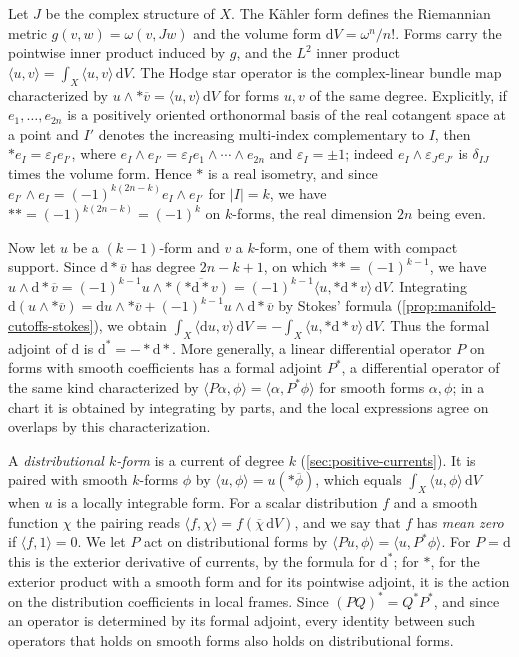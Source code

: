 Let $J$ be the complex structure of $X$. The K\"ahler form defines the Riemannian metric $g(v,w)=\omega(v,Jw)$ and the volume form $\mathrm dV=\omega^n/n!$. Forms carry the pointwise inner product induced by $g$, and the $L^2$ inner product $\langle u,v\rangle=\int_X\langle u,v\rangle\,\mathrm dV$. The Hodge star operator is the complex-linear bundle map characterized by $u\wedge*\overline v=\langle u,v\rangle\,\mathrm dV$ for forms $u,v$ of the same degree. Explicitly, if $e_1,\ldots,e_{2n}$ is a positively oriented orthonormal basis of the real cotangent space at a point and $I'$ denotes the increasing multi-index complementary to $I$, then $*e_I=\varepsilon_Ie_{I'}$, where $e_I\wedge e_{I'}=\varepsilon_Ie_1\wedge\cdots\wedge e_{2n}$ and $\varepsilon_I=\pm1$; indeed $e_I\wedge\varepsilon_Je_{J'}$ is $\delta_{IJ}$ times the volume form. Hence $*$ is a real isometry, and since $e_{I'}\wedge e_I=(-1)^{k(2n-k)}e_I\wedge e_{I'}$ for $|I|=k$, we have $**=(-1)^{k(2n-k)}=(-1)^k$ on $k$-forms, the real dimension $2n$ being even.

Now let $u$ be a $(k-1)$-form and $v$ a $k$-form, one of them with compact support. Since $\mathrm d*\overline v$ has degree $2n-k+1$, on which $**=(-1)^{k-1}$, we have $u\wedge\mathrm d*\overline v=(-1)^{k-1}u\wedge*\overline{(*\mathrm d*v)}=(-1)^{k-1}\langle u,*\mathrm d*v\rangle\,\mathrm dV$. Integrating $\mathrm d(u\wedge*\overline v)=\mathrm du\wedge*\overline v+(-1)^{k-1}u\wedge\mathrm d*\overline v$ by Stokes' formula (\cref{prop:manifold-cutoffs-stokes}), we obtain $\int_X\langle\mathrm du,v\rangle\,\mathrm dV=-\int_X\langle u,*\mathrm d*v\rangle\,\mathrm dV$. Thus the formal adjoint of $\mathrm d$ is $\mathrm d^*=-*\mathrm d*$. More generally, a linear differential operator $P$ on forms with smooth coefficients has a formal adjoint $P^*$, a differential operator of the same kind characterized by $\langle P\alpha,\phi\rangle=\langle\alpha,P^*\phi\rangle$ for smooth forms $\alpha,\phi$; in a chart it is obtained by integrating by parts, and the local expressions agree on overlaps by this characterization.

A \emph{distributional $k$-form} is a current of degree $k$ (\cref{sec:positive-currents}). It is paired with smooth $k$-forms $\phi$ by $\langle u,\phi\rangle=u(*\overline\phi)$, which equals $\int_X\langle u,\phi\rangle\,\mathrm dV$ when $u$ is a locally integrable form. For a scalar distribution $f$ and a smooth function $\chi$ the pairing reads $\langle f,\chi\rangle=f(\overline\chi\,\mathrm dV)$, and we say that $f$ has \emph{mean zero} if $\langle f,1\rangle=0$. We let $P$ act on distributional forms by $\langle Pu,\phi\rangle=\langle u,P^*\phi\rangle$. For $P=\mathrm d$ this is the exterior derivative of currents, by the formula for $\mathrm d^*$; for $*$, for the exterior product with a smooth form and for its pointwise adjoint, it is the action on the distribution coefficients in local frames. Since $(PQ)^*=Q^*P^*$, and since an operator is determined by its formal adjoint, every identity between such operators that holds on smooth forms also holds on distributional forms.

